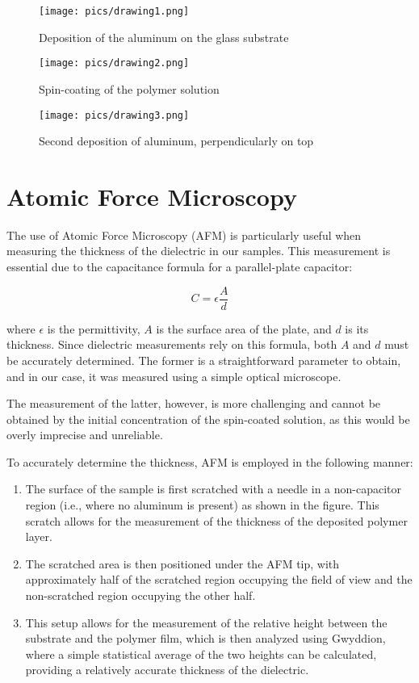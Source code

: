 \begin{figure}[!htb]
  \texttt{[image: pics/drawing1.png]}
  \caption{Deposition of the aluminum on the glass substrate}\label{fig:drawing1}
\endminipage\hfill
{}
  \texttt{[image: pics/drawing2.png]}
  \caption{Spin-coating of the polymer solution}\label{fig:drawing2}
\endminipage\hfill
{}%
  \texttt{[image: pics/drawing3.png]}
  \caption{Second deposition of aluminum, perpendicularly on top}\label{fig:drawing3}
\endminipage
\end{figure}

\section{Atomic Force Microscopy}

The use of Atomic Force Microscopy (AFM) is particularly useful when measuring the thickness of the dielectric in our samples. This measurement is essential due to the capacitance formula for a parallel-plate capacitor:

\[
C = \epsilon \frac{A}{d}
\]

where $\epsilon$ is the permittivity, $A$ is the surface area of the plate, and $d$ is its thickness. Since dielectric measurements rely on this formula, both $A$ and $d$ must be accurately determined. The former is a straightforward parameter to obtain, and in our case, it was measured using a simple optical microscope. %


The measurement of the latter, however, is more challenging and cannot be obtained by the initial concentration of the spin-coated solution, as this would be overly imprecise and unreliable.

To accurately determine the thickness, AFM is employed in the following manner:
\begin{enumerate}
    \item The surface of the sample is first scratched with a needle in a non-capacitor region (i.e., where no aluminum is present) as shown in the figure. This scratch allows for the measurement of the thickness of the deposited polymer layer. %
    \item The scratched area is then positioned under the AFM tip, with approximately half of the scratched region occupying the field of view and the non-scratched region occupying the other half.
    \item This setup allows for the measurement of the relative height between the substrate and the polymer film, which is then analyzed using Gwyddion, %
where a simple statistical average of the two heights can be calculated, providing a relatively accurate thickness of the dielectric.
\end{enumerate}

